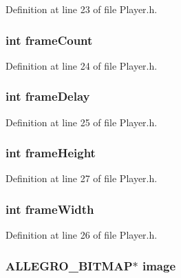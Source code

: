 Definition at line 23 of file Player.\-h.

\hypertarget{struct_image_abaf7d77bd2fc7eb6125fa605bd645b67}{
\subsubsection[{frame\-Count}]{\setlength{\rightskip}{0pt plus 5cm}int frame\-Count}}\label{struct_image_abaf7d77bd2fc7eb6125fa605bd645b67}


Definition at line 24 of file Player.\-h.

\hypertarget{struct_image_a2064d16c49632c5426219fae4734331c}{
\subsubsection[{frame\-Delay}]{\setlength{\rightskip}{0pt plus 5cm}int frame\-Delay}}\label{struct_image_a2064d16c49632c5426219fae4734331c}


Definition at line 25 of file Player.\-h.

\hypertarget{struct_image_ae86b4f83e04bd20a090cd8965b4716ca}{
\subsubsection[{frame\-Height}]{\setlength{\rightskip}{0pt plus 5cm}int frame\-Height}}\label{struct_image_ae86b4f83e04bd20a090cd8965b4716ca}


Definition at line 27 of file Player.\-h.

\hypertarget{struct_image_ac995d2487f1e00d19fc05941a9e4e89a}{
\subsubsection[{frame\-Width}]{\setlength{\rightskip}{0pt plus 5cm}int frame\-Width}}\label{struct_image_ac995d2487f1e00d19fc05941a9e4e89a}


Definition at line 26 of file Player.\-h.

\hypertarget{struct_image_a2e9bc0a29cac926ccbf8e4cd858d2145}{
\subsubsection[{image}]{\setlength{\rightskip}{0pt plus 5cm}A\-L\-L\-E\-G\-R\-O\-\_\-\-B\-I\-T\-M\-A\-P$\ast$ image}}\label{struct_image_a2e9bc0a29cac926ccbf8e4cd858d2145}


